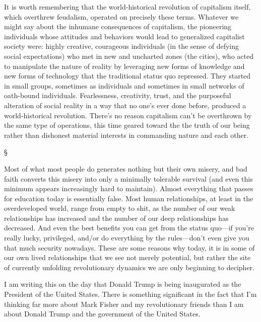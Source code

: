 \documentclass[a4paper,12pt,margin=.5in]{article}
\begin{document}
It is worth remembering that the world-historical revolution of
capitalism itself, which overthrew feudalism, operated on precisely
these terms. Whatever we might say about the inhumane consequences of
capitalism, the pioneering individuals whose attitudes and behaviors
would lead to generalized capitalist society were: highly creative,
courageous individuals (in the sense of defying social expectations) who
met in new and uncharted zones (the cities), who acted to manipulate the
nature of reality by leveraging new forms of knowledge and new forms of
technology that the traditional status quo repressed. They started in
small groups, sometimes as individuals and sometimes in small networks
of oath-bound individuals. Fearlessness, creativity, trust, and the
purposeful alteration of social reality in a way that no one's ever done
before, produced a world-historical revolution. There's no reason
capitalism can't be overthrown by the same type of operations, this time
geared toward the the truth of our being rather than dishonest material
interests in commanding nature and each other.

§

Most of what most people do generates nothing but their own misery, and
bad faith converts this misery into only a minimally tolerable survival
(and even this minimum appears increasingly hard to maintain). Almost
everything that passes for education today is essentially false. Most
human relationships, at least in the overdeveloped world, range from
empty to shit, as the number of our weak relationships has increased and
the number of our deep relationships has decreased. And even the best
benefits you can get from the status quo---if you're really lucky,
privileged, and/or do everything by the rules---don't even give you that
much security nowadays. These are some reasons why today, it is in some
of our own lived relationships that we see not merely potential, but
rather the site of currently unfolding revolutionary dynamics we are
only beginning to decipher.

I am writing this on the day that Donald Trump is being inaugurated as
the President of the United States. There is something significant in
the fact that I'm thinking far more about Mark Fisher and my
revolutionary friends than I am about Donald Trump and the government of
the United States.
\end{document}
